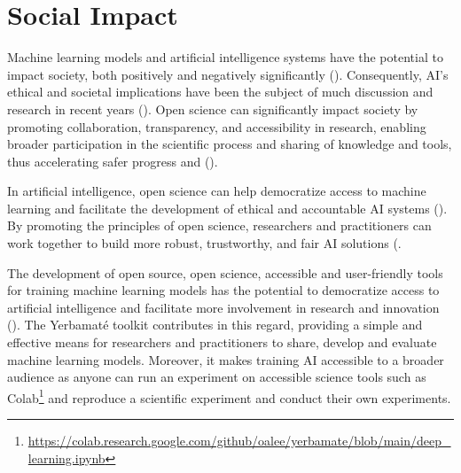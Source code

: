 
\section{Social Impact}
Machine learning models and artificial intelligence systems have the potential to impact society, both positively and negatively significantly (\cite{mittelstadt2019principles, jobin2019global,arrieta2020explainable, floridi2018ai4people}). Consequently, AI's ethical and societal implications have been the subject of much discussion and research in recent years (\cite{floridi2018ai4people, goodman2017european, floridi2019establishing, mittelstadt2016ethics}).
Open science can significantly impact society by promoting collaboration, transparency, and accessibility in research, enabling broader participation in the scientific process and sharing of knowledge and tools, thus accelerating safer progress and (\cite{kocak2022transparency, wachter2017transparent, coro2020open, braun2018open, paton2019open, goodman2017european}). 

In artificial intelligence, open science can help democratize access to machine learning and facilitate the development of ethical and accountable AI systems (\cite{goodman2017european, batarseh2020data}). By promoting the principles of open science, researchers and practitioners can work together to build more robust, trustworthy, and fair AI solutions (\cite{accountabilityInAi, kocak2022transparency,wachter2017transparent, coro2020open, braun2018open, hicks2021open, goodman2017european}.

The development of open source, open science, accessible and user-friendly tools for training machine learning models has the potential to democratize access to artificial intelligence and facilitate more involvement in research and innovation (\cite{goodman2017european}). The Yerbamaté toolkit contributes in this regard, providing a simple and effective means for researchers and practitioners to share, develop and evaluate machine learning models. Moreover, it makes training AI accessible to a broader audience as anyone can run an experiment on accessible science tools such as Colab\footnote{\url{https://colab.research.google.com/github/oalee/yerbamate/blob/main/deep_learning.ipynb}} and reproduce a scientific experiment and conduct their own experiments.


